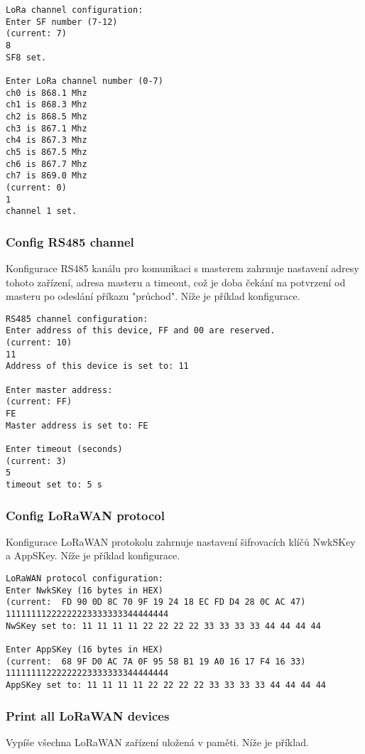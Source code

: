 \begin{lstlisting}
LoRa channel configuration:
Enter SF number (7-12)
(current: 7)
8
SF8 set.

Enter LoRa channel number (0-7)
ch0 is 868.1 Mhz
ch1 is 868.3 Mhz
ch2 is 868.5 Mhz
ch3 is 867.1 Mhz
ch4 is 867.3 Mhz
ch5 is 867.5 Mhz
ch6 is 867.7 Mhz
ch7 is 869.0 Mhz
(current: 0)
1
channel 1 set.
\end{lstlisting}

\subsubsection{Config RS485 channel}
Konfigurace RS485 kanálu pro komunikaci s masterem zahrnuje nastavení adresy tohoto zařízení, adresa masteru a timeout, což je doba čekání na potvrzení od masteru po odeslání příkazu "průchod". Níže je příklad konfigurace.

\begin{lstlisting}
RS485 channel configuration:
Enter address of this device, FF and 00 are reserved.
(current: 10)
11
Address of this device is set to: 11

Enter master address: 
(current: FF)
FE
Master address is set to: FE

Enter timeout (seconds)
(current: 3)
5
timeout set to: 5 s
\end{lstlisting}


\subsubsection{Config LoRaWAN protocol}
Konfigurace LoRaWAN protokolu zahrnuje nastavení šifrovacích klíčů NwkSKey a AppSKey. Níže je příklad konfigurace.

\begin{lstlisting}
LoRaWAN protocol configuration:
Enter NwkSKey (16 bytes in HEX)
(current:  FD 90 0D 8C 70 9F 19 24 18 EC FD D4 28 0C AC 47)
11111111222222223333333344444444
NwSKey set to: 11 11 11 11 22 22 22 22 33 33 33 33 44 44 44 44

Enter AppSKey (16 bytes in HEX)
(current:  68 9F D0 AC 7A 0F 95 58 B1 19 A0 16 17 F4 16 33)
11111111222222223333333344444444
AppSKey set to: 11 11 11 11 22 22 22 22 33 33 33 33 44 44 44 44
\end{lstlisting}


\subsubsection{Print all LoRaWAN devices}
Vypíše všechna LoRaWAN zařízení uložená v paměti. Níže je příklad.


